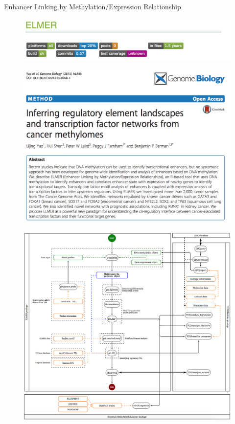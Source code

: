 \documentclass[slidestop,compress,11pt,xcolor=dvipsnames]{beamer}
\begin{document}
\begin{frame}{ Enhancer Linking by Methylation/Expression Relationship}
 \vspace*{-0.5cm}
 \begin{figure}
  \centering
  \includegraphics[width=0.8\linewidth]{ELMER/elmer1.png}
 \end{figure}
 \vspace*{-0.5cm}
 \begin{figure}
  \centering
  \includegraphics[width=0.8\linewidth]{ELMER/elmer2.png}
 \end{figure}
\end{frame}



\begin{frame}[plain]%
 \vspace*{-0.3cm}
 \begin{figure}
  \centering
  \includegraphics[width=0.95\linewidth]{workflow_elmer2.png}
 \end{figure}
\end{frame}
\end{document}
